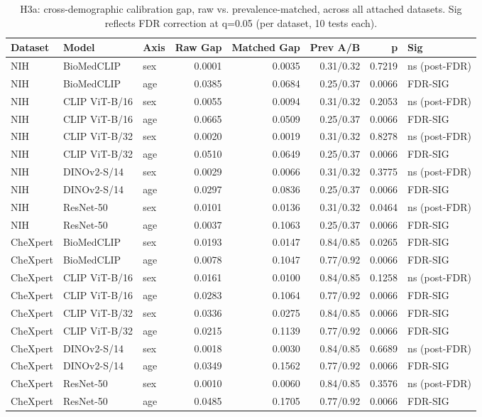 \begin{table}[t]
  \centering
  \small
  \caption{H3a: cross-demographic calibration gap, raw vs. prevalence-matched, across all attached datasets. Sig reflects FDR correction at q=0.05 (per dataset, 10 tests each).}
  \label{tab:calib}
  \begin{tabular}{lllrrrrl}
    \toprule
    \textbf{Dataset} & \textbf{Model} & \textbf{Axis} & \textbf{Raw Gap} & \textbf{Matched Gap} & \textbf{Prev A/B} & \textbf{p} & \textbf{Sig} \\
    \midrule
    NIH & BioMedCLIP & sex & 0.0001 & 0.0035 & 0.31/0.32 & 0.7219 & ns (post-FDR) \\
    NIH & BioMedCLIP & age & 0.0385 & 0.0684 & 0.25/0.37 & 0.0066 & FDR-SIG \\
    NIH & CLIP ViT-B/16 & sex & 0.0055 & 0.0094 & 0.31/0.32 & 0.2053 & ns (post-FDR) \\
    NIH & CLIP ViT-B/16 & age & 0.0665 & 0.0509 & 0.25/0.37 & 0.0066 & FDR-SIG \\
    NIH & CLIP ViT-B/32 & sex & 0.0020 & 0.0019 & 0.31/0.32 & 0.8278 & ns (post-FDR) \\
    NIH & CLIP ViT-B/32 & age & 0.0510 & 0.0649 & 0.25/0.37 & 0.0066 & FDR-SIG \\
    NIH & DINOv2-S/14 & sex & 0.0029 & 0.0066 & 0.31/0.32 & 0.3775 & ns (post-FDR) \\
    NIH & DINOv2-S/14 & age & 0.0297 & 0.0836 & 0.25/0.37 & 0.0066 & FDR-SIG \\
    NIH & ResNet-50 & sex & 0.0101 & 0.0136 & 0.31/0.32 & 0.0464 & ns (post-FDR) \\
    NIH & ResNet-50 & age & 0.0037 & 0.1063 & 0.25/0.37 & 0.0066 & FDR-SIG \\
    \addlinespace[2pt]
    CheXpert & BioMedCLIP & sex & 0.0193 & 0.0147 & 0.84/0.85 & 0.0265 & FDR-SIG \\
    CheXpert & BioMedCLIP & age & 0.0078 & 0.1047 & 0.77/0.92 & 0.0066 & FDR-SIG \\
    CheXpert & CLIP ViT-B/16 & sex & 0.0161 & 0.0100 & 0.84/0.85 & 0.1258 & ns (post-FDR) \\
    CheXpert & CLIP ViT-B/16 & age & 0.0283 & 0.1064 & 0.77/0.92 & 0.0066 & FDR-SIG \\
    CheXpert & CLIP ViT-B/32 & sex & 0.0336 & 0.0275 & 0.84/0.85 & 0.0066 & FDR-SIG \\
    CheXpert & CLIP ViT-B/32 & age & 0.0215 & 0.1139 & 0.77/0.92 & 0.0066 & FDR-SIG \\
    CheXpert & DINOv2-S/14 & sex & 0.0018 & 0.0030 & 0.84/0.85 & 0.6689 & ns (post-FDR) \\
    CheXpert & DINOv2-S/14 & age & 0.0349 & 0.1562 & 0.77/0.92 & 0.0066 & FDR-SIG \\
    CheXpert & ResNet-50 & sex & 0.0010 & 0.0060 & 0.84/0.85 & 0.3576 & ns (post-FDR) \\
    CheXpert & ResNet-50 & age & 0.0485 & 0.1705 & 0.77/0.92 & 0.0066 & FDR-SIG \\
    \bottomrule
  \end{tabular}
\end{table}